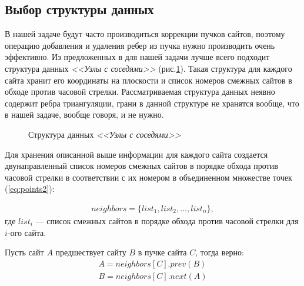 \documentclass[12pt]{article}
\begin{document}
\subsection{Выбор структуры данных}
В нашей задаче будут часто производиться коррекции пучков сайтов,
поэтому операцию добавления и удаления ребер из пучка нужно производить очень эффективно.
Из предложенных в \cite[стр. 11-17]{Skvortsov} для нашей задачи лучше всего подходит структура данных {\itshape <<Узлы с соседями>>} (рис.\ref{pic:struct}).
Такая структура для каждого сайта хранит его координаты на плоскости и список номеров смежных сайтов в обходе против часовой стрелки.
Рассматриваемая структура данных неявно содержит ребра триангуляции, грани в данной структуре не хранятся вообще,
что в нашей задаче, вообще говоря, и не нужно.

\begin{figure}[htb!]
	\caption{Структура данных {\itshape <<Узлы с соседями>>}}
	\label{pic:struct}
\end{figure}

Для хранения описанной выше информации для каждого сайта создается двунаправленный список номеров смежных сайтов
в порядке обхода против часовой стрелки
в соответствии с их номером в объединенном множестве точек (\ref{eq:points2}):

\begin{equation}\label{eq:neib}
\begin{split}
	neighbors = \{list_1, list_2, \ldots, list_n\},
\end{split}
\end{equation}
где $list_i$ --- список смежных сайтов в порядке обхода против часовой стрелки для $i$-ого сайта.

Пусть сайт $A$ предшествует сайту $B$ в пучке сайта $C$, тогда верно:
\begin{equation}\label{eq:op}
\begin{split}
	A = neighbors[C].prev(B) \\
	B = neighbors[C].next(A)
\end{split}
\end{equation}
\end{document}
